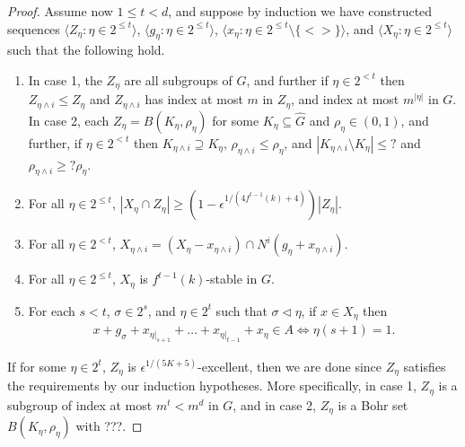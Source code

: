 \documentclass[11pt]{article}
\theoremstyle{definition}
\begin{document}
\begin{proof}
Assume now $1\leq t<d$, and suppose by induction we have constructed sequences $\langle Z_{\eta}: \eta\in 2^{\leq t}\rangle$, $\langle g_{\eta}: \eta\in 2^{\leq t}\rangle$, $\langle x_{\eta}: \eta\in 2^{\leq t}\setminus \{<>\}\rangle$, and $\langle X_{\eta}: \eta\in 2^{\leq t}\rangle$ such that the following hold.
\begin{enumerate}
\item In case 1, the $Z_{\eta}$ are all subgroups of $G$, and further if $\eta\in 2^{< t}$ then $Z_{\eta\wedge i}\leq Z_{\eta}$ and $Z_{\eta\wedge i}$ has index at most $m$ in $Z_{\eta}$, and index at most $m^{|\eta|}$ in $G$.  In case 2, each $Z_{\eta}=B(K_{\eta},\rho_{\eta})$ for some $K_{\eta}\subseteq \widehat{G}$ and $\rho_{\eta}\in (0,1)$, and further, if $\eta\in 2^{< t}$ then $K_{\eta\wedge i}\supseteq K_{\eta}$, $\rho_{\eta\wedge i}\leq \rho_{\eta}$, and $|K_{\eta\wedge i}\setminus K_{\eta}|\leq ?$ and $\rho_{\eta\wedge i}\geq ?\rho_{\eta}$.
\item For all $\eta\in 2^{\leq t}$, $|X_{\eta}\cap Z_{\eta}|\geq (1-\epsilon^{1/(4f^{t-1}(k)+4)})|Z_{\eta}|$.
\item For all $\eta\in 2^{<t}$, $X_{\eta\wedge i}=(X_{\eta}-x_{\eta \wedge i})\cap N^i(g_{\eta}+x_{\eta \wedge i})$.
\item For all $\eta\in 2^{\leq t}$, $X_{\eta}$ is $f^{t-1}(k)$-stable in $G$.
\item For each $s<t$, $\sigma \in 2^{s}$, and $\eta\in 2^{t}$ such that $\sigma \triangleleft \eta$, if $x\in X_{\eta}$ then 
\begin{align}\label{5}
x+g_{\sigma}+ x_{\eta|_{s+1}}+\ldots+x_{\eta|_{t-1}}+x_{\eta} \in A \Leftrightarrow \eta(s+1)=1.
\end{align}
\end{enumerate}


If for some $\eta\in 2^t$, $Z_{\eta}$ is $\epsilon^{1/(5K+5)}$-excellent, then we are done since $Z_{\eta}$ satisfies the requirements by our induction hypotheses.  More specifically, in case 1, $Z_{\eta}$ is a subgroup of index at most $m^t<m^d$ in $G$, and in case 2, $Z_{\eta}$ is a Bohr set $B(K_{\eta},\rho_{\eta})$ with ???.  


\end{proof}
\end{document}
